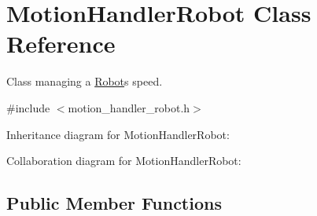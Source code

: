 \hypertarget{classMotionHandlerRobot}{}\section{Motion\+Handler\+Robot Class Reference}
\label{classMotionHandlerRobot}


Class managing a \hyperlink{classRobot}{Robot}\textquotesingle{}s speed.  




{\ttfamily \#include $<$motion\+\_\+handler\+\_\+robot.\+h$>$}



Inheritance diagram for Motion\+Handler\+Robot\+:


Collaboration diagram for Motion\+Handler\+Robot\+:
\subsection*{Public Member Functions}
